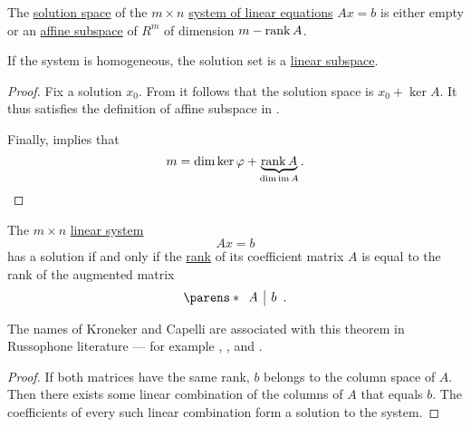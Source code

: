 \begin{corollary}\label{thm:linear_system_solution_space}
  The \hyperref[def:system_of_linear_equations/solution_space]{solution space} of the \( m \times n \) \hyperref[def:system_of_linear_equations]{system of linear equations} \( Ax = b \) is either empty or an \hyperref[def:affine_subspace]{affine subspace} of \( R^m \) of dimension \( m - \operatorname{rank} A \).

  If the system is homogeneous, the solution set is a \hyperref[def:module/submodel]{linear subspace}.
\end{corollary}
\begin{proof}
  Fix a solution \( x_0 \). From  it follows that the solution space is \( x_0 + \ker A \). It thus satisfies the definition of affine subspace in .

  Finally,  implies that
  \begin{equation*}
    m = \dim \ker \varphi + \underbrace{ \operatorname{rank} A }_{ \dim \operatorname{im} A }.
  \end{equation*}
\end{proof}

\begin{theorem}\label{thm:kroneker_capelli}
  The \( m \times n \) \hyperref[def:system_of_linear_equations]{linear system}
  \begin{equation*}
    Ax = b
  \end{equation*}
  has a solution if and only if the \hyperref[def:rank_and_nullity]{rank} of its coefficient matrix \( A \) is equal to the rank of the augmented matrix
  \begin{equation*}
    \parens*
    {
      \begin{array}{c|c}
        A & b
      \end{array}
    }.
  \end{equation*}
\end{theorem}
\begin{comments}
  \item The names of Kroneker and Capelli are associated with this theorem in Russophone literature --- for example , ,  and .
\end{comments}
\begin{proof}
  If both matrices have the same rank, \( b \) belongs to the column space of \( A \). Then there exists some linear combination of the columns of \( A \) that equals \( b \). The coefficients of every such linear combination form a solution to the system.
\end{proof}
